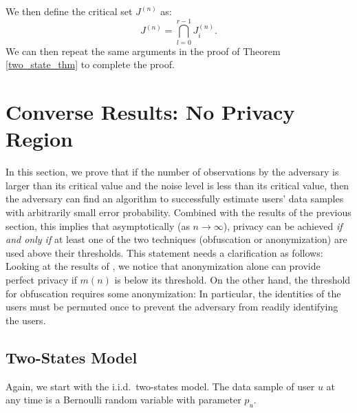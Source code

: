 We then define the critical set $J^{(n)}$ as:
\[
J^{(n)}=\bigcap_{l=0}^{r-1} J_i^{(n)}.
\]
We can then repeat the same arguments in the proof of Theorem \ref{two_state_thm} to complete the proof.





\section{Converse Results: No Privacy Region}
\label{converse}

In this section, we prove that if the number of observations by the adversary is larger than its critical value and the noise level is less than its critical value, then the adversary can find an algorithm to successfully estimate users' data samples with arbitrarily small error probability. Combined with the results of the previous section, this implies that asymptotically (as $n \rightarrow \infty$), privacy can be achieved \emph{if and only if} at least one of  the two techniques (obfuscation or anonymization) are used above their thresholds. This statement needs a clarification as follows:  Looking at the results of \cite{tifs2016}, we notice that anonymization alone can provide perfect privacy if $m(n)$ is below its threshold. On the other hand, the threshold for obfuscation requires some anonymization: In particular, the identities of the users must be permuted once to prevent the adversary from readily identifying the users.




\subsection{Two-States Model}
Again, we start with the i.i.d.\ two-states model. The data sample of user $u$ at any time is a Bernoulli random variable with parameter $p_u$.


